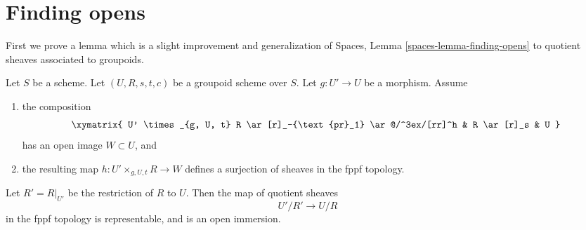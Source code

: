 \section{Finding opens}
\label{section-finding-opens}


\medskip\noindent
First we prove a lemma which is a slight improvement and generalization of
Spaces, Lemma \ref{spaces-lemma-finding-opens}
to quotient sheaves associated to groupoids.

\begin{lemma}
\label{lemma-better-finding-opens}
Let $S$ be a scheme.
Let $(U, R, s, t, c)$ be a groupoid scheme over $S$.
Let $g : U' \to U$ be a morphism.
Assume
\begin{enumerate}
\item the composition
$$
\xymatrix{
U' \times_{g, U, t} R \ar[r]_-{\text{pr}_1} \ar@/^3ex/[rr]^h
& R \ar[r]_s & U
}
$$
has an open image $W \subset U$, and
\item the resulting map $h : U' \times_{g, U, t} R \to W$
defines a surjection of sheaves in the fppf topology.
\end{enumerate}
Let $R' = R|_{U'}$ be the restriction of $R$ to $U$. Then the map
of quotient sheaves
$$
U'/R' \to U/R
$$
in the fppf topology is representable, and is an open immersion.
\end{lemma}

